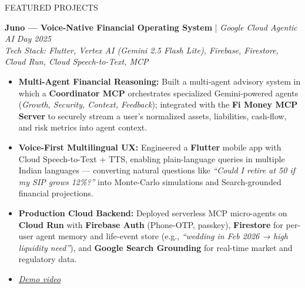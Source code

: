 \documentclass{resume} %
\begin{document}

\begin{rSection}{FEATURED PROJECTS}
\vspace{-1.25em}

\item \textbf{Juno — Voice-Native Financial Operating System} | \textit{Google Cloud Agentic AI Day 2025} \\
\textit{Tech Stack: Flutter, Vertex AI (Gemini 2.5 Flash Lite), Firebase, Firestore, Cloud Run, Cloud Speech-to-Text, MCP}
\begin{itemize}
    \item \textbf{Multi-Agent Financial Reasoning:} Built a multi-agent advisory system in which a \textbf{Coordinator MCP} orchestrates specialized Gemini-powered agents (\textit{Growth, Security, Context, Feedback}); integrated with the \textbf{Fi Money MCP Server} to securely stream a user's normalized assets, liabilities, cash-flow, and risk metrics into agent context.
    \item \textbf{Voice-First Multilingual UX:} Engineered a \textbf{Flutter} mobile app with Cloud Speech-to-Text + TTS, enabling plain-language queries in multiple Indian languages — converting natural questions like \textit{``Could I retire at 50 if my SIP grows 12\%?''} into Monte-Carlo simulations and Search-grounded financial projections.
    \item \textbf{Production Cloud Backend:} Deployed serverless MCP micro-agents on \textbf{Cloud Run} with \textbf{Firebase Auth} (Phone-OTP, passkey), \textbf{Firestore} for per-user agent memory and life-event store (e.g., \textit{``wedding in Feb 2026 → high liquidity need''}), and \textbf{Google Search Grounding} for real-time market and regulatory data.
    \item \href{https://drive.google.com/file/d/12SFmxkaDG8kcLFpLTg6fAuKgeOlFq4Y8/view?usp=sharing}{\textit{Demo video}}
\end{itemize}
\end{rSection}
\end{document}
